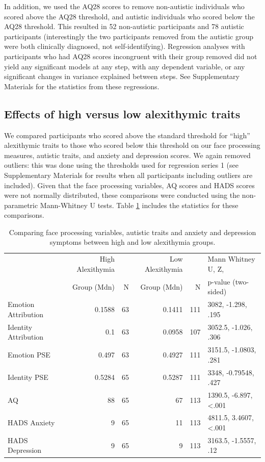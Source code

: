 \documentclass[
]{article}
\begin{document}
In addition, we used the AQ28 scores to remove non-autistic individuals who scored above the AQ28 threshold, and autistic individuals who scored below the AQ28 threshold. This resulted in 52 non-autistic participants and 78 autistic participants (interestingly the two participants removed from the autistic group were both clinically diagnosed, not self-identifying). Regression analyses with participants who had AQ28 scores incongruent with their group removed did not yield any significant models at any step, with any dependent variable, or any significant changes in variance explained between steps. See Supplementary Materials for the statistics from these regressions.

\hypertarget{effects-of-high-versus-low-alexithymic-traits}{%
\subsection*{Effects of high versus low alexithymic traits}\label{effects-of-high-versus-low-alexithymic-traits}}

We compared participants who scored above the standard threshold for ``high'' alexithymic traits to those who scored below this threshold on our face processing measures, autistic traits, and anxiety and depression scores. We again removed outliers: this was done using the thresholds used for regression series 1 (see Supplementary Materials for results when all participants including outliers are included). Given that the face processing variables, AQ scores and HADS scores were not normally distributed, these comparisons were conducted using the non-parametric Mann-Whitney U tests. Table \ref{tab:table9} includes the statistics for these comparisons.

\begin{table}[H]

\caption{\label{tab:table9}Comparing face processing variables, autistic traits and anxiety and depression symptoms between high and low alexithymia groups.}
\centering
\begin{tabular}[t]{lrrrrl}
\toprule
 & High Alexithymia &  & Low Alexithymia &  & Mann Whitney U, Z,\\
 & Group (Mdn) & N & Group (Mdn) & N & p-value (two-sided)\\
\midrule
Emotion Attribution & 0.1588 & 63 & 0.1411 & 111 & 3082, -1.298, .195\\
Identity Attribution & 0.1 & 63 & 0.0958 & 107 & 3052.5, -1.026, .306\\
Emotion PSE & 0.497 & 63 & 0.4927 & 111 & 3151.5, -1.0803, .281\\
\addlinespace
Identity PSE & 0.5284 & 65 & 0.5287 & 111 & 3348, -0.79548, .427\\
AQ & 88 & 65 & 67 & 113 & 1390.5, -6.897, <.001\\
HADS Anxiety & 9 & 65 & 11 & 113 & 4811.5, 3.4607, <.001\\
HADS Depression & 9 & 65 & 9 & 113 & 3163.5, -1.5557, .12\\
\bottomrule
\end{tabular}
\end{table}
\end{document}
